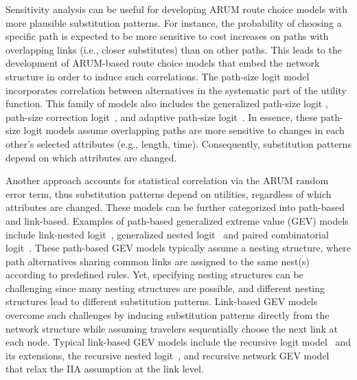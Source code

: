 \documentclass[a4paper,11pt]{article}
\begin{document}
Sensitivity analysis can be useful for developing ARUM route choice models with more plausible substitution patterns. For instance, the probability of choosing a specific path is expected to be more sensitive to cost increases on paths with overlapping links (i.e., closer substitutes) than on other paths. This leads to the development of ARUM-based route choice models that embed the network structure in order to induce such correlations. The path-size logit model~\citep{ben1999discrete} incorporates correlation between alternatives in the systematic part of the utility function. This family of models also includes the generalized path-size logit \citep{ramming2001network}, path-size correction logit~\citep{bovy2008factor}, and adaptive path-size logit~\citep{duncan2020path}. In essence, these path-size logit models assume overlapping paths are more sensitive to changes in each other's selected attributes (e.g., length, time). Consequently, substitution patterns depend on which attributes are changed. 

Another approach accounts for statistical correlation via the ARUM random error term, thus substitution patterns depend on utilities, regardless of which attributes are changed. 
These models can be further categorized into path-based and link-based. Examples of path-based generalized extreme value (GEV) models include link-nested logit~\citep{vovsha1997application,bekhor1999formulations, marzano2008covariance}, generalized nested logit~\citep{wen2001generalized, bekhor2001stochastic} and paired combinatorial logit~\citep{chu1989paired, bekhor1999formulations, gliebe1999route}. These path-based GEV models typically assume a nesting structure, where path alternatives sharing common links are assigned to the same nest(s) according to predefined rules. Yet, specifying nesting structures can be challenging since many nesting structures are possible, and different nesting structures lead to different substitution patterns. 
Link-based GEV models overcome such challenges by inducing substitution patterns directly from the network structure while assuming travelers sequentially choose the next link at each node. Typical link-based GEV models include the recursive logit model~\citep{fosgerau2013link} and its extensions, the recursive nested logit~\citep{mai2015nested}, and recursive network GEV model~\citep{mai2016method,oyama2019prism} that relax the IIA assumption at the link level. 
\end{document}
